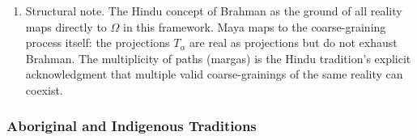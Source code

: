 \documentclass[
]{article}
\begin{document}
\begin{enumerate}
  itself. The cosmos is cyclical: creation, preservation, destruction
  (Brahma, Vishnu, Shiva), endlessly. The individual navigates flux
  through dharma, right action appropriate to one's station and stage of
  life, which provides a stable orientation within the turning wheel.
\item
  Structural note. The Hindu concept of Brahman as the ground of all
  reality maps directly to \(\Omega\) in this framework. Maya maps to
  the coarse-graining process itself: the projections \(T_\alpha\) are
  real as projections but do not exhaust Brahman. The multiplicity of
  paths (margas) is the Hindu tradition's explicit acknowledgment that
  multiple valid coarse-grainings of the same reality can coexist.
\end{enumerate}

\subsubsection{Aboriginal and Indigenous
Traditions}\label{aboriginal-and-indigenous-traditions}
\end{document}
